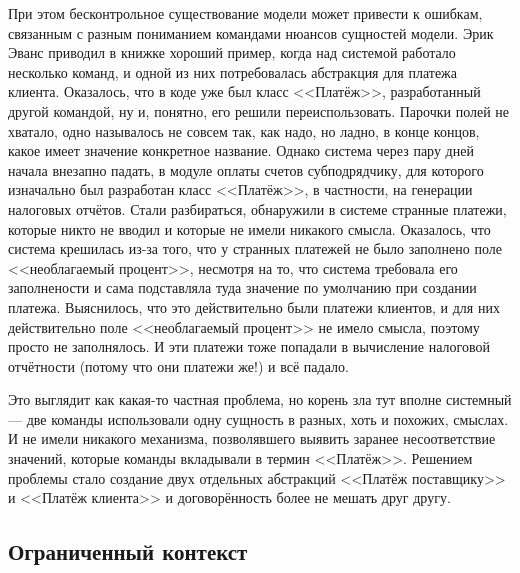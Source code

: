 \documentclass[a5paper]{article}
\begin{document}
При этом бесконтрольное существование модели может привести к ошибкам, связанным с разным пониманием командами нюансов сущностей модели. Эрик Эванс приводил в книжке хороший пример, когда над системой работало несколько команд, и одной из них потребовалась абстракция для платежа клиента. Оказалось, что в коде уже был класс <<Платёж>>, разработанный другой командой, ну и, понятно, его решили переиспользовать. Парочки полей не хватало, одно называлось не совсем так, как надо, но ладно, в конце концов, какое имеет значение конкретное название. Однако система через пару дней начала внезапно падать, в модуле оплаты счетов субподрядчику, для которого изначально был разработан класс <<Платёж>>, в частности, на генерации налоговых отчётов. Стали разбираться, обнаружили в системе странные платежи, которые никто не вводил и которые не имели никакого смысла. Оказалось, что система крешилась из-за того, что у странных платежей не было заполнено поле <<необлагаемый процент>>, несмотря на то, что система требовала его заполнености и сама подставляла туда значение по умолчанию при создании платежа. Выяснилось, что это действительно были платежи клиентов, и для них действительно поле <<необлагаемый процент>> не имело смысла, поэтому просто не заполнялось. И эти платежи тоже попадали в вычисление налоговой отчётности (потому что они платежи же!) и всё падало.

Это выглядит как какая-то частная проблема, но корень зла тут вполне системный --- две команды использовали одну сущность в разных, хоть и похожих, смыслах. И не имели никакого механизма, позволявшего выявить заранее несоответствие значений, которые команды вкладывали в термин <<Платёж>>. Решением проблемы стало создание двух отдельных абстракций <<Платёж поставщику>> и <<Платёж клиента>> и договорённость более не мешать друг другу.

\subsection{Ограниченный контекст}
\end{document}
